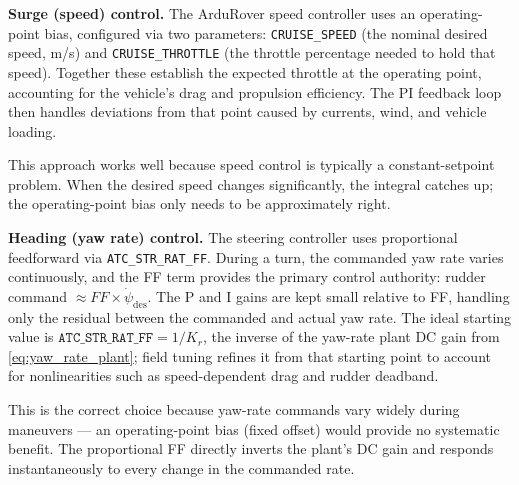 \documentclass[../../book.tex]{subfiles}
\begin{document}
\textbf{Surge (speed) control.}
The ArduRover speed controller uses an operating-point bias, configured via
two parameters: \texttt{CRUISE\_SPEED} (the nominal desired speed, m/s) and
\texttt{CRUISE\_THROTTLE} (the throttle percentage needed to hold that speed).
Together these establish the expected throttle at the operating point,
accounting for the vehicle's drag and propulsion efficiency.  The PI feedback
loop then handles deviations from that point caused by currents, wind, and
vehicle loading.

This approach works well because speed control is typically a constant-setpoint
problem.  When the desired speed changes significantly, the integral catches up;
the operating-point bias only needs to be approximately right.

\textbf{Heading (yaw rate) control.}
The steering controller uses proportional feedforward via
\texttt{ATC\_STR\_RAT\_FF}.  During a turn, the commanded yaw rate varies
continuously, and the FF term provides the primary control authority:
rudder command $\approx FF \times \dot\psi_\mathrm{des}$.  The P and I gains
are kept small relative to FF, handling only the residual between the
commanded and actual yaw rate.
The ideal starting value is $\mathtt{ATC\_STR\_RAT\_FF} = 1/K_r$, the
inverse of the yaw-rate plant DC gain from \cref{eq:yaw_rate_plant};
field tuning refines it from that starting point to account for
nonlinearities such as speed-dependent drag and rudder deadband.

This is the correct choice because yaw-rate commands vary widely during
maneuvers --- an operating-point bias (fixed offset) would provide no
systematic benefit.  The proportional FF directly inverts the plant's DC gain
and responds instantaneously to every change in the commanded rate.
\end{document}
